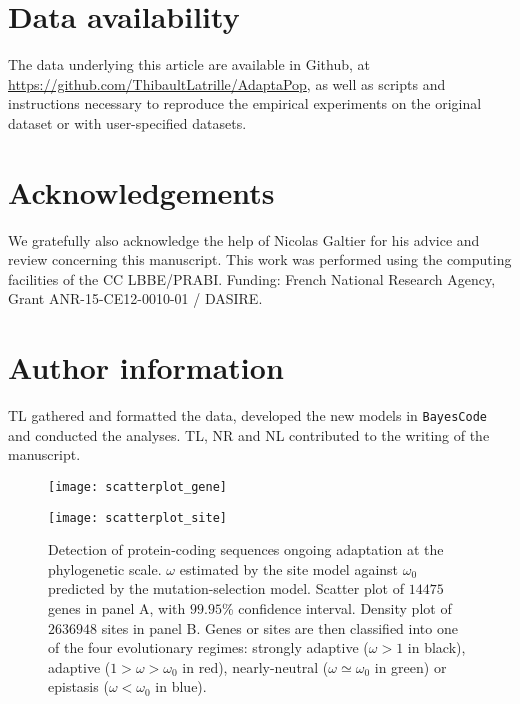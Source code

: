 \documentclass{article}
\begin{document}
\section{Data availability}\label{sec:data-availability}

The data underlying this article are available in Github, at \url{https://github.com/ThibaultLatrille/AdaptaPop}, as well as scripts and instructions necessary to reproduce the empirical experiments on the original dataset or with user-specified datasets.

\section{Acknowledgements}\label{sec:acknowledgements}

We gratefully also acknowledge the help of Nicolas Galtier for his advice and review concerning this manuscript.
This work was performed using the computing facilities of the CC LBBE/PRABI.
Funding: French National Research Agency, Grant ANR-15-CE12-0010-01 / DASIRE.

\section{Author information}\label{sec:author-information}

TL gathered and formatted the data, developed the new models in \texttt{BayesCode} and conducted the analyses.
TL, NR and NL contributed to the writing of the manuscript.

\printbibliography

\begin{figure*}[!ht]
	\centering
	\begin{minipage}{0.49\linewidth}
		\texttt{[image: scatterplot\_gene]}
	\end{minipage}
	\hfill
	\begin{minipage}{0.49\linewidth}
		\texttt{[image: scatterplot\_site]}
	\end{minipage}
	\hfill
	\caption{
		Detection of protein-coding sequences ongoing adaptation at the phylogenetic scale.
		$\omega$ estimated by the site model against $\omega_{0}$ predicted by the mutation-selection model.
		Scatter plot of $14475$ genes in panel A, with $99.95$\% confidence interval. Density plot of $2636948$ sites in panel B.
		Genes or sites are then classified into one of the four evolutionary regimes: strongly adaptive ($\omega > 1$ in black), adaptive ($1 > \omega > \omega_{0}$ in red), nearly-neutral ($\omega \simeq \omega_{0}$ in green) or epistasis ($\omega < \omega_{0}$ in blue).}
	\label{fig:scatterplot}
\end{figure*}
\end{document}
